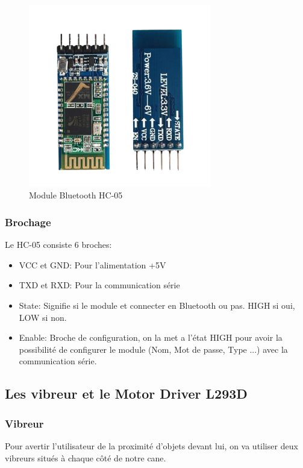 \begin{figure}[!htbp]
    \centering
    \includegraphics[width=8cm]{assets/HC-05/pinout.png}
    \caption{Module Bluetooth HC-05}
\end{figure}

\FloatBarrier

\subsubsection{Brochage}
Le HC-05 consiste 6 broches:
\begin{itemize}
    \item VCC et GND: Pour l'alimentation +5V
    \item TXD et RXD: Pour la communication série
    \item State: Signifie si le module et connecter en Bluetooth ou pas. HIGH si oui, LOW si non.
    \item Enable: Broche de configuration, on la met a l'état HIGH pour avoir la possibilité de configurer le module (Nom, Mot de passe, Type ...) avec la communication série.
\end{itemize}

\subsection{Les vibreur et le Motor Driver L293D}

\subsubsection{Vibreur}

Pour avertir l'utilisateur de la proximité d'objets devant lui, on va utiliser deux vibreurs situés à chaque côté de notre cane.

